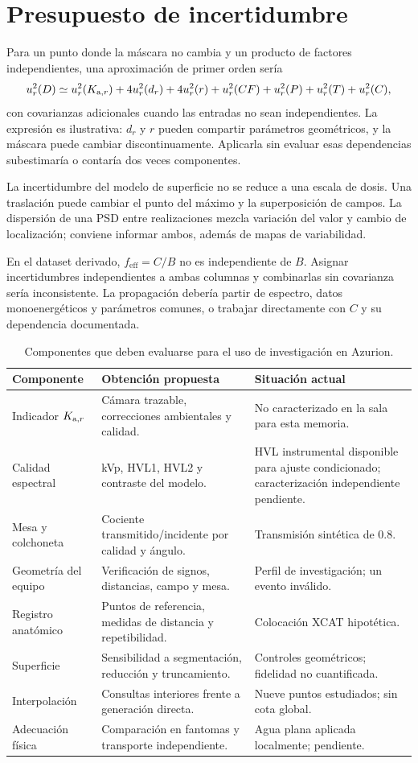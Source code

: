 \section{Presupuesto de incertidumbre}
Para un punto donde la máscara no cambia y un producto de factores independientes, una aproximación de primer orden sería
\begin{equation}\label{eq:unc}
u_r^2(D)\simeq u_r^2(K_{\mathrm{a},r})+4u_r^2(d_r)+4u_r^2(r)+u_r^2(CF)+u_r^2(P)+u_r^2(T)+u_r^2(C),
\end{equation}
con covarianzas adicionales cuando las entradas no sean independientes. La expresión es ilustrativa: $d_r$ y $r$ pueden compartir parámetros geométricos, y la máscara puede cambiar discontinuamente. Aplicarla sin evaluar esas dependencias subestimaría o contaría dos veces componentes.

La incertidumbre del modelo de superficie no se reduce a una escala de dosis. Una traslación puede cambiar el punto del máximo y la superposición de campos. La dispersión de una PSD entre realizaciones mezcla variación del valor y cambio de localización; conviene informar ambos, además de mapas de variabilidad.

En el dataset derivado, $f_{\mathrm{eff}}=C/B$ no es independiente de $B$. Asignar incertidumbres independientes a ambas columnas y combinarlas sin covarianza sería inconsistente. La propagación debería partir de espectro, datos monoenergéticos y parámetros comunes, o trabajar directamente con $C$ y su dependencia documentada.

\begin{table}[htbp]\centering\small
\caption{Componentes que deben evaluarse para el uso de investigación en Azurion.}
\begin{tabularx}{\textwidth}{p{30mm}YY}\toprule
Componente & Obtención propuesta & Situación actual\\\midrule
Indicador $K_{\mathrm{a},r}$ & Cámara trazable, correcciones ambientales y calidad. & No caracterizado en la sala para esta memoria.\\
Calidad espectral & kVp, HVL1, HVL2 y contraste del modelo. & HVL instrumental disponible para ajuste condicionado; caracterización independiente pendiente.\\
Mesa y colchoneta & Cociente transmitido/incidente por calidad y ángulo. & Transmisión sintética de \num{0.8}.\\
Geometría del equipo & Verificación de signos, distancias, campo y mesa. & Perfil de investigación; un evento inválido.\\
Registro anatómico & Puntos de referencia, medidas de distancia y repetibilidad. & Colocación XCAT hipotética.\\
Superficie & Sensibilidad a segmentación, reducción y truncamiento. & Controles geométricos; fidelidad no cuantificada.\\
Interpolación & Consultas interiores frente a generación directa. & Nueve puntos estudiados; sin cota global.\\
Adecuación física & Comparación en fantomas y transporte independiente. & Agua plana aplicada localmente; pendiente.\\\bottomrule
\end{tabularx}
\end{table}

